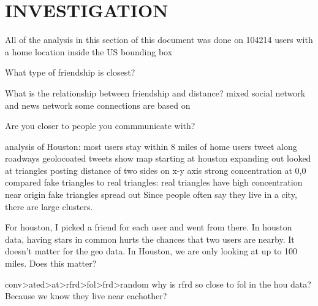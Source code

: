 \documentclass{sig-alternate}
\begin{document}
\section{INVESTIGATION}

All of the analysis in this section of this document was done on 104214 users with a home location inside the US bounding box


What type of friendship is closest?

What is the relationship between friendship and distance?
mixed social network and news network
some connections are based on 

Are you closer to people you commmunicate with?















analysis of Houston:
most users stay within 8 miles of home
users tweet along roadways
geolocoated tweets show map starting at houston expanding out
looked at triangles posting distance of two sides on x-y axis
strong concentration at 0,0
compared fake triangles to real triangles:
    real triangles have high concentration near origin
    fake triangles spread out
Since people often say they live in a city, there are large clusters.

For houston, I picked a friend for each user and went from there.
In houston data, having stars in common hurts the chances that two users are nearby.  It doesn't matter for the geo data. In Houston, we are only looking at up to 100 miles. Does this matter?


conv>ated>at>rfrd>fol>frd>random
why is rfrd so close to fol in the hou data? Because we know they live near eachother?





\end{document}
